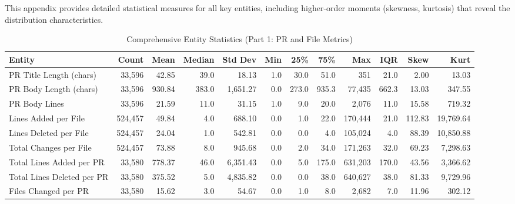 \documentclass[11pt]{article}
\begin{document}
This appendix provides detailed statistical measures for all key entities, including higher-order moments (skewness, kurtosis) that reveal the distribution characteristics.

\begin{table}[H]
\centering
\caption{Comprehensive Entity Statistics (Part 1: PR and File Metrics)}
\tiny
\begin{tabular}{@{}lrrrrrrrrrrr@{}}
\toprule
\textbf{Entity} & \textbf{Count} & \textbf{Mean} & \textbf{Median} & \textbf{Std Dev} & \textbf{Min} & \textbf{25\%} & \textbf{75\%} & \textbf{Max} & \textbf{IQR} & \textbf{Skew} & \textbf{Kurt} \\
\midrule
PR Title Length (chars) & 33,596 & 42.85 & 39.0 & 18.13 & 1.0 & 30.0 & 51.0 & 351 & 21.0 & 2.00 & 13.03 \\
PR Body Length (chars) & 33,596 & 930.84 & 383.0 & 1,651.27 & 0.0 & 273.0 & 935.3 & 77,435 & 662.3 & 13.03 & 347.55 \\
PR Body Lines & 33,596 & 21.59 & 11.0 & 31.15 & 1.0 & 9.0 & 20.0 & 2,076 & 11.0 & 15.58 & 719.32 \\
Lines Added per File & 524,457 & 49.84 & 4.0 & 688.10 & 0.0 & 1.0 & 22.0 & 170,444 & 21.0 & 112.83 & 19,769.64 \\
Lines Deleted per File & 524,457 & 24.04 & 1.0 & 542.81 & 0.0 & 0.0 & 4.0 & 105,024 & 4.0 & 88.39 & 10,850.88 \\
Total Changes per File & 524,457 & 73.88 & 8.0 & 945.68 & 0.0 & 2.0 & 34.0 & 171,263 & 32.0 & 69.23 & 7,298.63 \\
Total Lines Added per PR & 33,580 & 778.37 & 46.0 & 6,351.43 & 0.0 & 5.0 & 175.0 & 631,203 & 170.0 & 43.56 & 3,366.62 \\
Total Lines Deleted per PR & 33,580 & 375.52 & 5.0 & 4,835.82 & 0.0 & 0.0 & 38.0 & 640,627 & 38.0 & 81.33 & 9,729.96 \\
Files Changed per PR & 33,580 & 15.62 & 3.0 & 54.67 & 0.0 & 1.0 & 8.0 & 2,682 & 7.0 & 11.96 & 302.12 \\
\bottomrule
\end{tabular}
\end{table}
\end{document}
